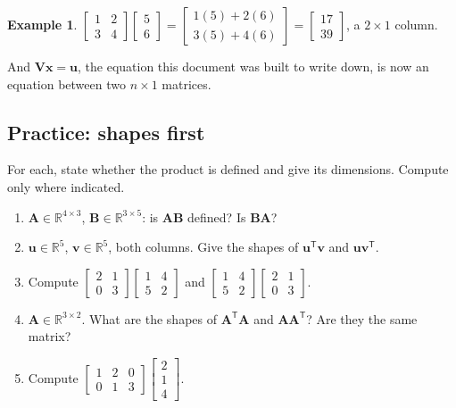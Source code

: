 \documentclass[11pt]{article}
\theoremstyle{plain}
\theoremstyle{definition}
\newtheorem{ex}{Example}[section]
\theoremstyle{remark}
\newcommand{\R}{\mathbb{R}}
\newcommand{\vc}[1]{\mathbf{#1}}        %
\newcommand{\mt}[1]{\mathbf{#1}}        %
\newcommand{\T}{^{\mathsf{T}}}          %
\begin{document}
\begin{ex}
$\begin{bmatrix}1&2\\3&4\end{bmatrix}\begin{bmatrix}5\\6\end{bmatrix}
 =\begin{bmatrix}1(5)+2(6)\\3(5)+4(6)\end{bmatrix}
 =\begin{bmatrix}17\\39\end{bmatrix}$, a $2\times1$ column.
\end{ex}

\noindent And $\mt{V}\vc{x}=\vc{u}$, the equation this document was built to
write down, is now an equation between two $n\times1$ matrices.

\subsection{Practice: shapes first}
For each, state whether the product is defined and give its dimensions. Compute
only where indicated.

\begin{enumerate}[label=\textbf{P\arabic*.},leftmargin=2.6em,itemsep=5pt]
  \item $\mt{A}\in\R^{4\times3}$, $\mt{B}\in\R^{3\times5}$: is $\mt{A}\mt{B}$
        defined? Is $\mt{B}\mt{A}$?
  \item $\vc{u}\in\R^{5}$, $\vc{v}\in\R^{5}$, both columns. Give the shapes of
        $\vc{u}\T\vc{v}$ and $\vc{u}\vc{v}\T$.
  \item Compute
        $\begin{bmatrix}2&1\\0&3\end{bmatrix}
         \begin{bmatrix}1&4\\5&2\end{bmatrix}$
        and
        $\begin{bmatrix}1&4\\5&2\end{bmatrix}
         \begin{bmatrix}2&1\\0&3\end{bmatrix}$.
  \item $\mt{A}\in\R^{3\times2}$. What are the shapes of $\mt{A}\T\mt{A}$ and
        $\mt{A}\mt{A}\T$? Are they the same matrix?
  \item Compute
        $\begin{bmatrix}1&2&0\\0&1&3\end{bmatrix}
         \begin{bmatrix}2\\1\\4\end{bmatrix}$.
\end{enumerate}
\end{document}
